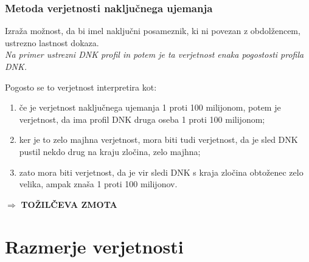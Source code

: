 \documentclass{beamer}
\begin{document}
\begin{frame}
    \frametitle{Metoda verjetnosti naključnega ujemanja}
    \begin{block}{}
        Izraža možnost, da bi imel naključni posameznik, ki ni povezan z obdolžencem, ustrezno lastnost dokaza.\\
        \textit{Na primer ustrezni DNK profil in potem je ta verjetnost enaka pogostosti profila DNK.} 
    \end{block}\vspace{2mm}
    Pogosto se to verjetnost interpretira kot:
    \begin{enumerate}
        \item če je verjetnost naključnega ujemanja 1 proti 100 milijonom, potem je verjetnost, da ima profil DNK druga oseba 1 proti 100 milijonom;
        \item ker je to zelo majhna verjetnost, mora biti tudi verjetnost, da je sled DNK pustil nekdo drug na kraju zločina, zelo majhna;
        \item zato mora biti verjetnost, da je vir sledi DNK s kraja zločina obtoženec zelo velika, ampak znaša 1 proti 100 milijonov.
    \end{enumerate} \vspace{1mm}
    \begin{block}{}
        \centering
        $\Rightarrow$ \textbf{TOŽILČEVA ZMOTA}
    \end{block} 
\end{frame}

\section{Razmerje verjetnosti}
\end{document}
